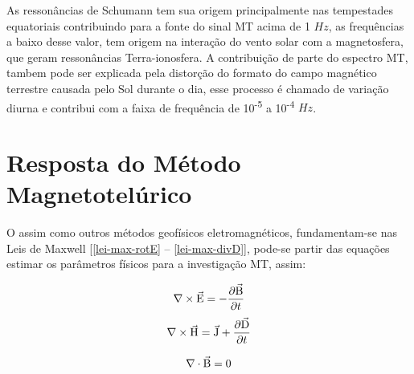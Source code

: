         As ressonâncias de Schumann tem sua origem principalmente nas tempestades equatoriais contribuindo para a fonte do sinal MT acima de 1 $Hz$, as frequências a baixo desse valor, tem origem na interação do vento solar com a magnetosfera, que geram ressonâncias Terra-ionosfera. A contribuição de parte do espectro MT, tambem pode ser explicada pela distorção do formato do campo magnético terrestre causada pelo Sol durante o dia, esse processo é chamado de variação diurna e contribui com a faixa de frequência de 10\textsuperscript{-5} a 10\textsuperscript{-4} $Hz$. 
        
        
        
        
        
    \section{Resposta do Método Magnetotelúrico}

        O \mt{} assim como outros métodos geofísicos eletromagnéticos, fundamentam-se nas Leis de Maxwell [\ref{lei-max-rotE} -- \ref{lei-max-divD}], pode-se partir das equações estimar os parâmetros físicos para a investigação MT, assim:
        
        \begin{equation}
            \label{lei-max-rotE}
            \nabla \times \vec{\textrm{E}} = - \dfrac{\partial \vec{\textrm{B}}}{\partial t}
        \end{equation}
        \begin{equation}
            \label{lei-max-rotH}
            \nabla \times \vec{\textrm{H}} = \vec{\textrm{J}} + \dfrac{\partial \vec{\textrm{D}}}{\partial t}
        \end{equation}

        \begin{equation}
            \label{lei-max-divB}
            \nabla \cdot \vec{\textrm{B}} = 0 
        \end{equation}

